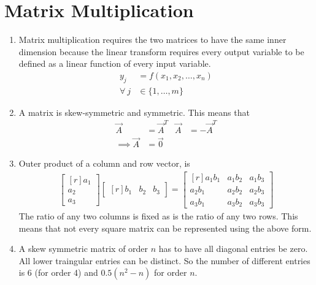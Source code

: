 \section{Matrix Multiplication}
\begin{enumerate}
\item Matrix multiplication requires the two matrices to have the same inner
dimension because the linear transform requires every output variable to be
defined as a linear function of every input variable.
\begin{align}
    y_j        & = f(x_1, x_2,\dots,x_n) \\
    \forall\ j & \in \{1,\dots,m\}
\end{align}

\item A matrix is skew-symmetric and symmetric. This means that
\begin{align}
    \vec{A}          & = \vec{A}^T & \vec{A} & = -\vec{A}^T \\
    \implies \vec{A} & = \vec{0}
\end{align}

\item Outer product of a column and row vector, is
\begin{align}
    \begin{bmatrix*}[r]
        a_1 \\ a_2 \\ a_3
    \end{bmatrix*} \begin{bmatrix*}[r]
                       b_1 & b_2 & b_3
                   \end{bmatrix*} = \begin{bmatrix*}[r]
                                        a_1b_1 & a_1b_2 & a_1b_3 \\
                                        a_2b_1 & a_2b_2 & a_2b_3 \\
                                        a_3b_1 & a_3b_2 & a_3b_3
                                    \end{bmatrix*}
\end{align}
The ratio of any two columns is fixed as is the ratio of any two rows. This
means that not every square matrix can be represented using the above form.

\item A skew symmetric matrix of order $ n $ has to have all diagonal entries
be zero. All lower traingular entries can be distinct. So the number of
different entries is 6 (for order 4) and $ 0.5(n^2 - n) $ for order $ n $.


\end{enumerate}
